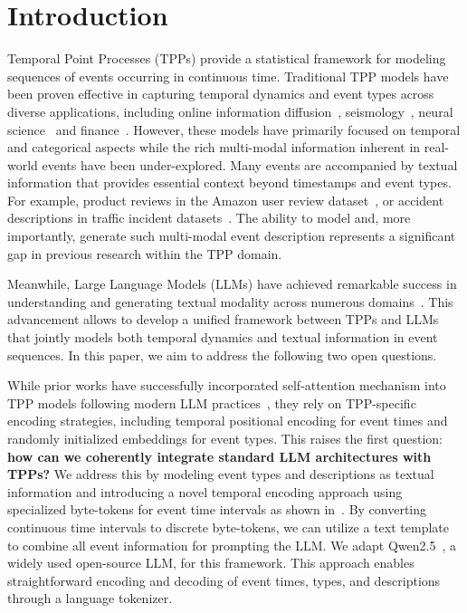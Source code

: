 \section{Introduction}

Temporal Point Processes (TPPs) provide a statistical framework for modeling sequences of events occurring in continuous time. Traditional TPP models have been proven effective in capturing temporal dynamics and event types across diverse applications, including online information diffusion~\citep{farajtabar2015coevolve,Mishra2016FeaturePrediction}, seismology~\citep{hawkes1971spectra}, neural science~\citep{johnson1996point} and finance~\citep{bacry2015hawkes}. However, these models have primarily focused on temporal and categorical aspects while the rich multi-modal information inherent in real-world events have been under-explored. 
Many events are accompanied by textual information that provides essential context beyond timestamps and event types. For example, product reviews in the Amazon user review dataset~\citep{ni2019justifying}, or accident descriptions in traffic incident datasets~\citep{zhou2020fast}. The ability to model and, more importantly, generate such multi-modal event description represents a significant gap in previous research within the TPP domain. 

Meanwhile, Large Language Models (LLMs) have achieved remarkable success in understanding and generating textual modality across numerous domains~\citep{jin2023time,m2024augmenting,xin2024bioinformatics}. This advancement allows to develop a unified framework between TPPs and LLMs that jointly models both temporal dynamics and textual information in event sequences. 
In this paper, we aim to address the following two open questions. 

While prior works have successfully incorporated self-attention mechanism into TPP models following modern LLM practices~\citep{zuo2020transformer,zhang2020self,mei2021transformer}, they rely on TPP-specific encoding strategies, including temporal positional encoding for event times and randomly initialized embeddings for event types. This raises the first question: \textbf{how can we coherently integrate standard LLM architectures with TPPs?} We address this by modeling event types and descriptions as textual information and introducing a novel temporal encoding approach using specialized byte-tokens for event time intervals as shown in~. By converting continuous time intervals to discrete byte-tokens, we can utilize a text template to combine all event information for prompting the LLM. We adapt Qwen2.5~\citep{yang2024qwen25}, a widely used open-source LLM, for this framework. This approach enables straightforward encoding and decoding of event times, types, and descriptions through a language tokenizer. 
    
